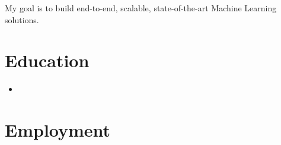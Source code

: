 \documentclass[11pt,a4paper,sans]{moderncv}        %
\begin{document}
\makecvtitle

\centering

\small{My goal is to build end-to-end, scalable, state-of-the-art Machine Learning solutions.}

\section{Education}

\vspace{4pt}

\begin{itemize}

\item{}

\end{itemize}

\section{Employment}

\vspace{4pt}
\end{document}
